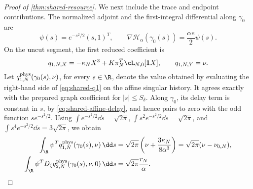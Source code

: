 \begin{proof}[Proof of \cref{thm:shared-resource}]
We next include the trace and endpoint contributions.  The normalized
adjoint and the first-integral differential along \(\gamma_0\) are
\begin{equation}
 \psi(s)=e^{-s^2/2}(s,1)^T,\qquad
 \nabla\mathscr H_\alpha(\gamma_0(s))
       =\frac{\alpha e}{2}\psi(s).                    \label{eq:shared-adjoint}
\end{equation}
On the uncut segment, the first reduced coefficient is
\begin{equation}
 q_{1,N,X}=-\kappa_NX^3
          +K\pi_N^T\cL_{N,0}[\mathbf1X],\qquad
 q_{1,N,Y}=\nu.                                       \label{eq:shared-q1}
\end{equation}
Let \(q^{\rm phys}_{1,N}(\gamma_0(s),\nu)\), for every \(s\in\R\),
denote the value obtained by evaluating the right-hand side of
\cref{eq:shared-q1} on the affine singular history.  It agrees exactly with
the prepared graph coefficient for \(|s|\le S_\delta\).  Along
\(\gamma_0\), its delay term is constant in \(s\), by
\cref{eq:shared-affine-delay}, and hence pairs to zero with the odd function
\(se^{-s^2/2}\).  Using
\(\int e^{-s^2/2}\dd s=\sqrt{2\pi}\),
\(\int s^2e^{-s^2/2}\dd s=\sqrt{2\pi}\), and
\(\int s^4e^{-s^2/2}\dd s=3\sqrt{2\pi}\), we obtain
\begin{align}
 \int_\R\psi^Tq^{\rm phys}_{1,N}(\gamma_0(s),\nu)\,\dd s
 &=\sqrt{2\pi}\left(\nu+\frac{3\kappa_N}{8\alpha^3}\right)
 =\sqrt{2\pi}(\nu-\nu_{0,N}),                        \label{eq:shared-leading-gap}\\
 \int_\R\psi^TD_\zeta q^{\rm phys}_{2,N}
       (\gamma_0(s),\nu,0)\,\dd s
 &=\sqrt{2\pi}\frac{r_N}{\alpha}.                    \label{eq:shared-melnikov}
\end{align}


\end{proof}
